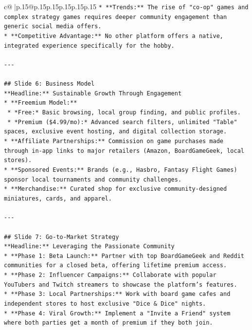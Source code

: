 \documentclass{article}
\begin{document}
{\begin{supertabular}{c@{$\;$}|p{.15\linewidth}@{}p{.15\linewidth}p{.15\linewidth}p{.15\linewidth}p{.15\linewidth}p{.15\linewidth}}
{{{\texttt{*   **Trends:** The rise of "co{-}op" games and complex strategy games requires deeper community engagement than generic social media offers.} \\
\texttt{*   **Competitive Advantage:** No other platform offers a native, integrated experience specifically for the hobby.} \\
\\ 
\texttt{{-}{-}{-}} \\
\\ 
\texttt{\#\# Slide 6: Business Model} \\
\texttt{**Headline:** Sustainable Growth Through Engagement} \\
\texttt{*   **Freemium Model:**} \\
\texttt{    *   *Free:* Basic browsing, local group finding, and public profiles.} \\
\texttt{    *   *Premium (\$4.99/mo):* Advanced search filters, unlimited "Table" spaces, exclusive event hosting, and digital collection storage.} \\
\texttt{*   **Affiliate Partnerships:** Commission on game purchases made through in{-}app links to major retailers (Amazon, BoardGameGeek, local stores).} \\
\texttt{*   **Sponsored Events:** Brands (e.g., Hasbro, Fantasy Flight Games) sponsor local tournaments and community challenges.} \\
\texttt{*   **Merchandise:** Curated shop for exclusive community{-}designed miniatures, cards, and apparel.} \\
\\ 
\texttt{{-}{-}{-}} \\
\\ 
\texttt{\#\# Slide 7: Go{-}to{-}Market Strategy} \\
\texttt{**Headline:** Leveraging the Passionate Community} \\
\texttt{*   **Phase 1: Beta Launch:** Partner with top BoardGameGeek and Reddit communities for a closed beta, offering lifetime premium access.} \\
\texttt{*   **Phase 2: Influencer Campaigns:** Collaborate with popular YouTubers and Twitch streamers to showcase the platform's features.} \\
\texttt{*   **Phase 3: Local Partnerships:** Work with board game cafes and independent stores to host exclusive "Dice \& Dice" nights.} \\
\texttt{*   **Phase 4: Viral Growth:** Implement a "Invite a Friend" system where both parties get a month of premium if they both join.} \\
}}}
\end{supertabular}}
\end{document}
